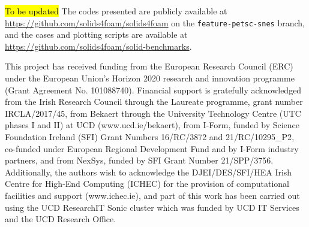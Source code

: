 \documentclass[sn-mathphys,Numbered]{sn-jnl}%
\begin{document}
\hl{To be updated}
The codes presented are publicly available at \url{https://github.com/solids4foam/solids4foam} on the \texttt{feature-petsc-snes} branch, and the cases and plotting scripts are available at \url{https://github.com/solids4foam/solid-benchmarks}.

This project has received funding from the European Research Council (ERC) under the European Union’s Horizon 2020 research and innovation programme (Grant Agreement No. 101088740).
Financial support is gratefully acknowledged from the Irish Research Council
through the Laureate programme, grant number IRCLA/2017/45, from Bekaert through
the University Technology Centre (UTC phases I and II) at UCD
(www.ucd.ie/bekaert), from I-Form, funded by Science Foundation Ireland (SFI)
Grant Numbers {16/RC/3872} and {21/RC/10295\_P2}, co-funded under European Regional Development Fund and by I-Form industry partners, and from NexSys, funded by SFI Grant Number 21/SPP/3756.
Additionally, the authors wish to acknowledge the DJEI/DES/SFI/HEA Irish Centre for High-End Computing (ICHEC) for the provision of computational facilities and support (www.ichec.ie), and part of this work has been carried out using the UCD ResearchIT Sonic cluster which was funded by UCD IT Services and the UCD Research Office.


\newpage

\newpage
\end{document}
